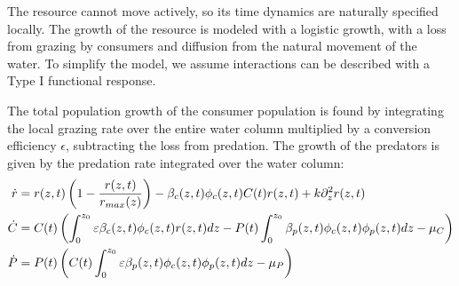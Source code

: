 %
The resource cannot move actively, so its time dynamics are naturally specified locally. The growth of the resource is modeled with a logistic growth, with a loss from grazing by consumers and diffusion from the natural movement of the water. To simplify the model, we assume interactions can be described with a Type I functional response. %


The total population growth of the consumer population is found by integrating the local grazing rate over the entire water column multiplied by a conversion efficiency $\epsilon$, subtracting the loss from predation. The growth of the predators is given by the predation rate integrated over the water column:
\begin{align}
	\dot{r} &= r(z,t)\pa{1-\frac{r(z,t)}{r_{max}(z)}} - \beta_c(z,t)\phi_c(z,t)C(t) r(z,t)  + k \partial_z^2 r(z,t)\\
	\dot{C} &= C(t)\left ( \int_0^{z_0} \varepsilon \beta_c(z,t)\phi_c(z,t)r(z,t) dz- P(t)\int_0^{z_0} \beta_p(z,t) \phi_c(z,t) \phi_p(z,t) dz - \mu_C \right ) \\
	\dot{P} &= P(t) \left ( C(t )\int_0^{z_0} \varepsilon \beta_p(z,t) \phi_c(z,t)\phi_p(z,t) dz - \mu_P \right )
  \label{eq:population_growth_prob_dens}
\end{align}


